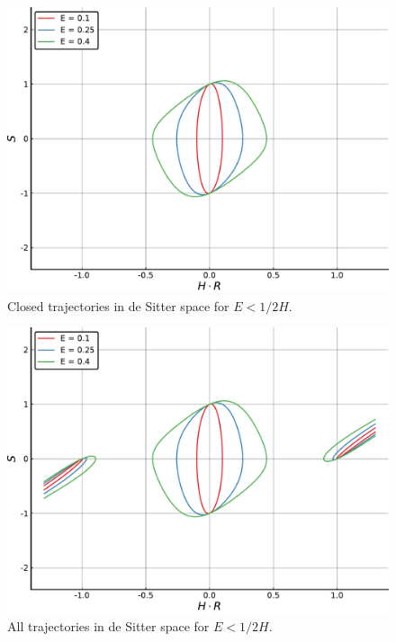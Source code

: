 \begin{figure}[h]
    \centering
    \includegraphics[width = 0.93 \linewidth]{Pictures/DeSitter_closed.pdf}
    \caption{Closed trajectories in de Sitter space for $E<1/2H$.}
    \label{fig:desiter_closed}
\end{figure}

\begin{figure}
    \centering
    \includegraphics[width = 0.93 \linewidth]{Pictures/DeSitter_closed_plus_expanding.pdf}
    \caption{All trajectories in de Sitter space for $E<1/2H$.}
    \label{fig:desiter_closed_plus_expanding}
\end{figure}

